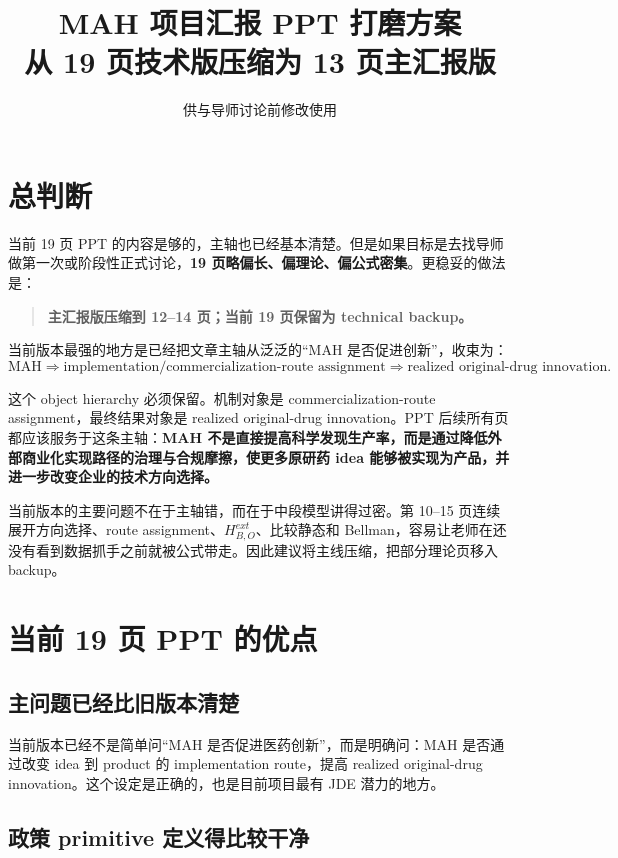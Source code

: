 \documentclass[12pt]{ctexart}
\title{MAH 项目汇报 PPT 打磨方案\\\large 从 19 页技术版压缩为 13 页主汇报版}
\author{}
\date{供与导师讨论前修改使用}
\begin{document}
\maketitle

\section{总判断}

当前 19 页 PPT 的内容是够的，主轴也已经基本清楚。但是如果目标是去找导师做第一次或阶段性正式讨论，\textbf{19 页略偏长、偏理论、偏公式密集}。更稳妥的做法是：

\begin{quote}
\textbf{主汇报版压缩到 12--14 页；当前 19 页保留为 technical backup。}
\end{quote}

当前版本最强的地方是已经把文章主轴从泛泛的“MAH 是否促进创新”，收束为：
\[
\text{MAH}
\Rightarrow
\text{implementation/commercialization-route assignment}
\Rightarrow
\text{realized original-drug innovation}.
\]

这个 object hierarchy 必须保留。机制对象是 commercialization-route assignment，最终结果对象是 realized original-drug innovation。PPT 后续所有页都应该服务于这条主轴：\textbf{MAH 不是直接提高科学发现生产率，而是通过降低外部商业化实现路径的治理与合规摩擦，使更多原研药 idea 能够被实现为产品，并进一步改变企业的技术方向选择。}

当前版本的主要问题不在于主轴错，而在于中段模型讲得过密。第 10--15 页连续展开方向选择、route assignment、$H^{ext}_{B,O}$、比较静态和 Bellman，容易让老师在还没有看到数据抓手之前就被公式带走。因此建议将主线压缩，把部分理论页移入 backup。

\section{当前 19 页 PPT 的优点}

\subsection{主问题已经比旧版本清楚}

当前版本已经不是简单问“MAH 是否促进医药创新”，而是明确问：MAH 是否通过改变 idea 到 product 的 implementation route，提高 realized original-drug innovation。这个设定是正确的，也是目前项目最有 JDE 潜力的地方。

\subsection{政策 primitive 定义得比较干净}
\end{document}
